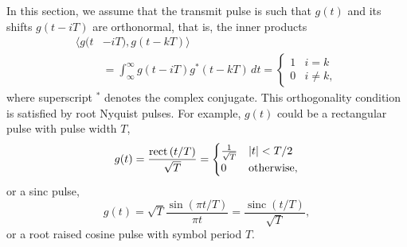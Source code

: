 \documentclass[journal]{IEEEtranTCOM}
\newcommand{\sinc}{\operatorname{sinc}}
\newcommand{\rect}[1]{\operatorname{rect}\left(#1\right)}
\begin{document}
In this section, we assume that the transmit pulse is such that $g(t)$ and its shifts $g(t - iT)$ are orthonormal, that is, the inner products
\begin{align}
\langle g(t &- iT), g(t - kT) \rangle \nonumber \\
&= \int_{\infty}^{\infty} g(t - iT)g^*(t-kT) \, dt = \begin{cases} 1 & i=k \\ 0 & i \neq k, \end{cases} \label{eq:contorthpulse}
\end{align}
where superscript $^*$ denotes the complex conjugate.  This orthogonality condition is satisfied by root Nyquist pulses.  For example, $g(t)$ could be a rectangular pulse with pulse width $T$,
\[
g(t) = \frac{\rect{t/T}}{\sqrt{T}} = \begin{cases} \frac{1}{\sqrt{T}} & \abs{t} < T/2 \\
0 & \text{otherwise},
 \end{cases}
 \]
or a sinc pulse, 
 \[
g(t) = \sqrt{T}\frac{\sin(\pi t / T)}{\pi t} = \frac{\sinc(t/T)}{\sqrt{T}},
\]
or a root raised cosine pulse with symbol period $T$.  %
\end{document}
